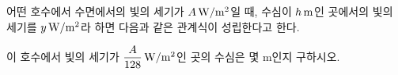 어떤 호수에서 수면에서의 빛의 세기가 $A\mkern3mu \mathrm{W/m^2}$일 때, 수심이 $h\mkern3mu \mathrm{m}$인 곳에서의 빛의 세기를 $y\mkern3mu \mathrm{W/m^2}$라 하면 다음과 같은 관계식이 성립한다고 한다.\par\smallskip{}\par\smallskip\noindent 이 호수에서 빛의 세기가 $\dfrac{A}{128}\mkern3mu \mathrm{W/m^2}$인 곳의 수심은 몇 $\mathrm{m}$인지 구하시오.
